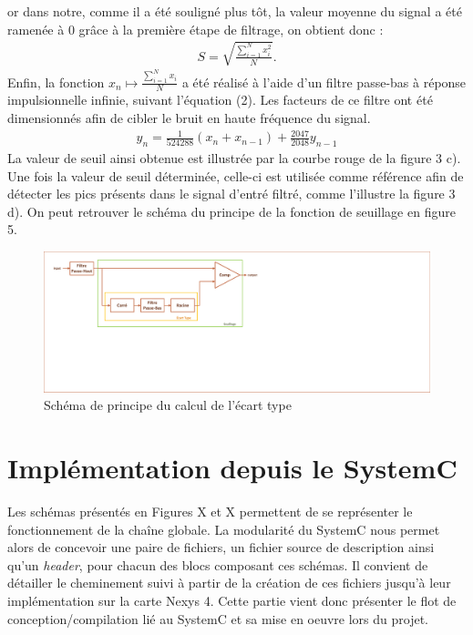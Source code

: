 \documentclass[a4paper,12pt]{article}
\begin{document}
\begin{itemize}
\begin{itemize}
or dans notre, comme il a été souligné plus tôt, la valeur moyenne du signal a été ramenée à 0 grâce à la première étape de filtrage, on obtient donc :
\begin{eqnarray*}
S = \sqrt{\frac{\sum^N_{i=1}x_i^2}{N}}.
\end{eqnarray*}
Enfin, la fonction $x_n\mapsto\frac{\sum^N_{i=1}x_i}{N}$ a été réalisé à l'aide d'un filtre passe-bas à réponse impulsionnelle infinie, suivant l'équation (2). Les facteurs de ce filtre ont été dimensionnés afin de cibler le bruit en haute fréquence du signal.
\begin{eqnarray}
y_n = \frac{1}{524288}\left(x_n + x_{n-1}\right) + \frac{2047}{2048}y_{n-1}
\end{eqnarray}
La valeur de seuil ainsi obtenue est illustrée par la courbe rouge de la figure 3 c). Une fois la valeur de seuil déterminée, celle-ci est utilisée comme référence afin de détecter les pics présents dans le signal d'entré filtré, comme
 l'illustre la figure 3 d). On peut retrouver le schéma du principe de la fonction de seuillage en figure 5.
\begin{figure}[H]
\centering
\includegraphics[width=\textwidth, keepaspectratio]{chainXavier.pdf}
\caption{Schéma de principe du calcul de l'écart type}
\end{figure}
\end{itemize}
\end{itemize}
\newpage
\section{Implémentation depuis le SystemC}
Les schémas présentés en Figures X et X permettent de se représenter le fonctionnement de la chaîne globale. La modularité du SystemC nous permet alors de concevoir une paire de fichiers, un fichier source de description ainsi qu'un \textit{header}, pour chacun des blocs composant ces schémas. Il convient de détailler le cheminement suivi à partir de la création de ces fichiers jusqu'à leur implémentation sur la carte Nexys 4. Cette partie vient donc présenter le flot de conception/compilation lié au SystemC et sa mise en oeuvre lors du projet.
\end{document}
